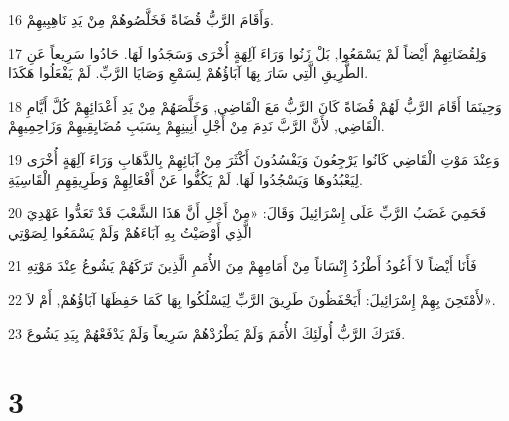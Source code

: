 \par 16 وَأَقَامَ الرَّبُّ قُضَاةً فَخَلَّصُوهُمْ مِنْ يَدِ نَاهِبِيهِمْ.
\par 17 وَلِقُضَاتِهِمْ أَيْضاً لَمْ يَسْمَعُوا, بَلْ زَنُوا وَرَاءَ آلِهَةٍ أُخْرَى وَسَجَدُوا لَهَا. حَادُوا سَرِيعاً عَنِ الطَّرِيقِ الَّتِي سَارَ بِهَا آبَاؤُهُمْ لِسَمْعِ وَصَايَا الرَّبِّ. لَمْ يَفْعَلُوا هَكَذَا.
\par 18 وَحِينَمَا أَقَامَ الرَّبُّ لَهُمْ قُضَاةً كَانَ الرَّبُّ مَعَ الْقَاضِي, وَخَلَّصَهُمْ مِنْ يَدِ أَعْدَائِهِمْ كُلَّ أَيَّامِ الْقَاضِي, لأَنَّ الرَّبَّ نَدِمَ مِنْ أَجْلِ أَنِينِهِمْ بِسَبَبِ مُضَايِقِيهِمْ وَزَاحِمِيهِمْ.
\par 19 وَعِنْدَ مَوْتِ الْقَاضِي كَانُوا يَرْجِعُونَ وَيَفْسُدُونَ أَكْثَرَ مِنْ آبَائِهِمْ بِالذَّهَابِ وَرَاءَ آلِهَةٍ أُخْرَى لِيَعْبُدُوهَا وَيَسْجُدُوا لَهَا. لَمْ يَكُفُّوا عَنْ أَفْعَالِهِمْ وَطَرِيقِهِمِ الْقَاسِيَةِ.
\par 20 فَحَمِيَ غَضَبُ الرَّبِّ عَلَى إِسْرَائِيلَ وَقَالَ: «مِنْ أَجْلِ أَنَّ هَذَا الشَّعْبَ قَدْ تَعَدُّوا عَهْدِيَ الَّذِي أَوْصَيْتُ بِهِ آبَاءَهُمْ وَلَمْ يَسْمَعُوا لِصَوْتِي
\par 21 فَأَنَا أَيْضاً لاَ أَعُودُ أَطْرُدُ إِنْسَاناً مِنْ أَمَامِهِمْ مِنَ الأُمَمِ الَّذِينَ تَرَكَهُمْ يَشُوعُ عِنْدَ مَوْتِهِ
\par 22 لأَمْتَحِنَ بِهِمْ إِسْرَائِيلَ: أَيَحْفَظُونَ طَرِيقَ الرَّبِّ لِيَسْلُكُوا بِهَا كَمَا حَفِظَهَا آبَاؤُهُمْ, أَمْ لاَ».
\par 23 فَتَرَكَ الرَّبُّ أُولَئِكَ الأُمَمَ وَلَمْ يَطْرُدْهُمْ سَرِيعاً وَلَمْ يَدْفَعْهُمْ بِيَدِ يَشُوعَ.

\chapter{3}

